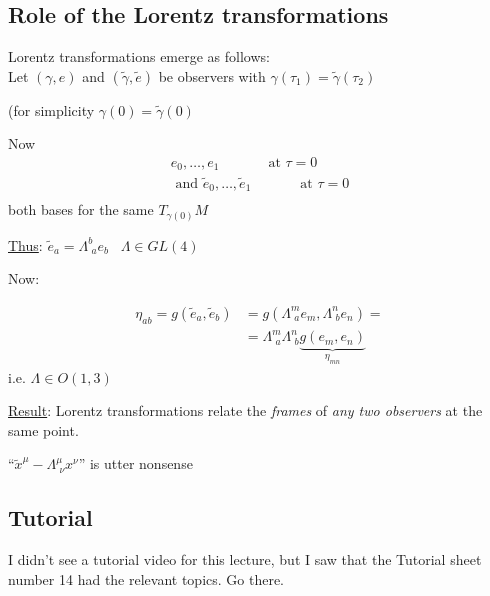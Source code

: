 \subsection{Role of the Lorentz transformations}

Lorentz transformations emerge as follows: \\
Let $(\gamma,e)$ and $(\widetilde{\gamma},\widetilde{e})$ be observers with $\gamma(\tau_1) = \widetilde{\gamma}(\tau_2)$

(for simplicity $\gamma(0) = \widetilde{\gamma}(0)$

Now 
\[
\begin{gathered}
  e_0 , \dots , e_1 \quad \quad \quad \, \text{ at } \tau = 0 \\
  \text{ and } 
  \widetilde{e}_0 , \dots , \widetilde{e}_1 \quad \quad \quad \, \text{ at }  \tau = 0 \\
\end{gathered}
\]
both bases for the same $T_{\gamma(0)}M$

\underline{Thus}: $\widetilde{e}_a = \Lambda^b_{ \, \, a} e_b $ \quad \quad \, $\Lambda \in GL(4)$

Now:

\[
\begin{aligned}
  \eta_{ab} = g(\widetilde{e}_a, \widetilde{e}_b) & = g(\Lambda^m_{ \, \, a}e_m, \Lambda^n_{ \, \, b} e_n ) = \\
  & = \Lambda^m_{ \, \, a} \Lambda^n_{ \, \, b} \underbrace{g(e_m,e_n)}_{ \eta_{mn}}
\end{aligned}
\]
i.e. $\Lambda \in O(1,3)$

\underline{Result}: Lorentz transformations relate the \emph{frames} of \emph{any two observers} at the same point.

``$\widetilde{x}^{\mu} - \Lambda^{\mu}_{ \, \, \nu} x^{\nu}$'' is utter nonsense

\subsection*{Tutorial}

I didn't see a tutorial video for this lecture, but I saw that the Tutorial sheet number 14 had the relevant topics.  Go there.

